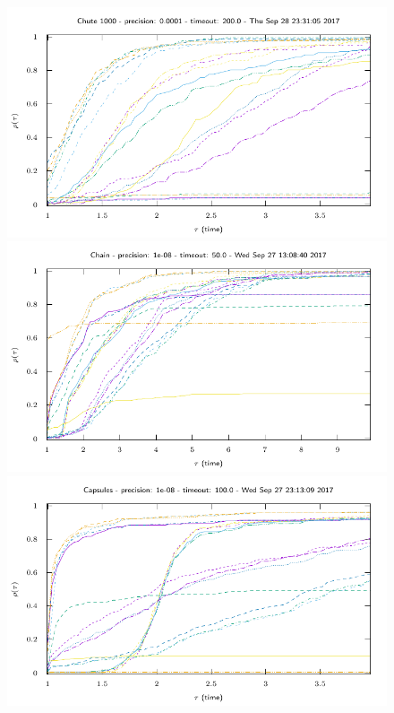 \begin{figure}
  \includegraphics[width=\figwidth]{../figure/NSGS/LocalSolver/1.0e-04/200/time/profile-Chute_1000.pdf} 
  \includegraphics[width=\figwidth]{../figure/NSGS/LocalSolver/1.0e-08/50/time/profile-Chain.pdf} 
  \includegraphics[width=\figwidth]{../figure/NSGS/LocalSolver/1.0e-08/100/time/profile-Capsules.pdf} 

\end{figure}
